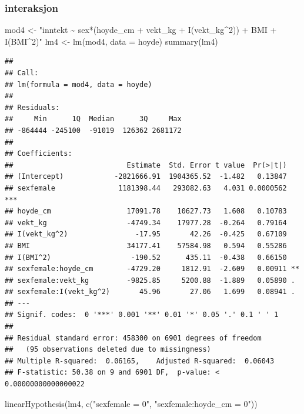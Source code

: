 \documentclass[
  12pt,
  norsk,
]{article}
\newenvironment{Shaded}{\begin{snugshade}}{\end{snugshade}}
\newcommand{\AttributeTok}[1]{\textcolor[rgb]{0.77,0.63,0.00}{#1}}
\newcommand{\FunctionTok}[1]{\textcolor[rgb]{0.00,0.00,0.00}{#1}}
\newcommand{\NormalTok}[1]{#1}
\newcommand{\OtherTok}[1]{\textcolor[rgb]{0.56,0.35,0.01}{#1}}
\newcommand{\StringTok}[1]{\textcolor[rgb]{0.31,0.60,0.02}{#1}}
\begin{document}
\hypertarget{interaksjon}{%
\subsubsection{interaksjon}\label{interaksjon}}

\begin{Shaded}
\begin{Highlighting}[]
\NormalTok{mod4 }\OtherTok{\textless{}{-}} \StringTok{"inntekt \textasciitilde{} sex*(hoyde\_cm + vekt\_kg + I(vekt\_kg\^{}2)) + BMI + I(BMI\^{}2)"}
\NormalTok{lm4 }\OtherTok{\textless{}{-}} \FunctionTok{lm}\NormalTok{(mod4, }\AttributeTok{data =}\NormalTok{ hoyde)}
\FunctionTok{summary}\NormalTok{(lm4)}
\end{Highlighting}
\end{Shaded}

\begin{verbatim}
## 
## Call:
## lm(formula = mod4, data = hoyde)
## 
## Residuals:
##     Min      1Q  Median      3Q     Max 
## -864444 -245100  -91019  126362 2681172 
## 
## Coefficients:
##                           Estimate  Std. Error t value  Pr(>|t|)    
## (Intercept)            -2821666.91  1904365.52  -1.482   0.13847    
## sexfemale               1181398.44   293082.63   4.031 0.0000562 ***
## hoyde_cm                  17091.78    10627.73   1.608   0.10783    
## vekt_kg                   -4749.34    17977.28  -0.264   0.79164    
## I(vekt_kg^2)                -17.95       42.26  -0.425   0.67109    
## BMI                       34177.41    57584.98   0.594   0.55286    
## I(BMI^2)                   -190.52      435.11  -0.438   0.66150    
## sexfemale:hoyde_cm        -4729.20     1812.91  -2.609   0.00911 ** 
## sexfemale:vekt_kg         -9825.85     5200.88  -1.889   0.05890 .  
## sexfemale:I(vekt_kg^2)       45.96       27.06   1.699   0.08941 .  
## ---
## Signif. codes:  0 '***' 0.001 '**' 0.01 '*' 0.05 '.' 0.1 ' ' 1
## 
## Residual standard error: 458300 on 6901 degrees of freedom
##   (95 observations deleted due to missingness)
## Multiple R-squared:  0.06165,    Adjusted R-squared:  0.06043 
## F-statistic: 50.38 on 9 and 6901 DF,  p-value: < 0.00000000000000022
\end{verbatim}

\begin{Shaded}
\begin{Highlighting}[]
 \FunctionTok{linearHypothesis}\NormalTok{(lm4, }\FunctionTok{c}\NormalTok{(}\StringTok{"sexfemale = 0"}\NormalTok{, }\StringTok{"sexfemale:hoyde\_cm = 0"}\NormalTok{))}
\end{Highlighting}
\end{Shaded}
\end{document}
